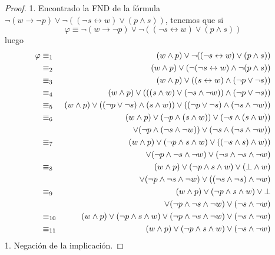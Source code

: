 \documentclass{article}
\begin{document}
\begin{itemize}
\begin{proof}
    1. Encontrado la FND de la fórmula
    $\neg(w \rightarrow \neg p) \lor \neg ((\neg s \leftrightarrow w) \lor (p \land s))$,
    tenemos que si
    \[
    \varphi \equiv \neg(w \rightarrow \neg p) \lor \neg ((\neg s \leftrightarrow w) \lor (p \land s))
    \]
    luego
    \begin{eqnarray*}
      \varphi
      &\equiv_{1}& (w \land p) \lor \neg ((\neg s \leftrightarrow w) \lor (p \land s))\\
      &\equiv_{2}& (w \land p) \lor ( \neg (\neg s \leftrightarrow w) \land  \neg (p \land s))\\
      &\equiv_{3}& (w \land p) \lor ((s \leftrightarrow w) \land  (\neg p \lor \neg s))\\
      &\equiv_{4}& (w \land p) \lor (((s \land w) \lor (\neg s \land \neg w)) \land  (\neg p \lor \neg s))\\
      &\equiv_{5}& (w \land p) \lor ((\neg p \lor \neg s) \land (s \land w)) \lor ((\neg p \lor \neg s)
      \land (\neg s \land \neg w))\\
      &\equiv_{6}& (w \land p) \lor (\neg p \land (s \land w)) \lor (\neg s \land (s \land w))\\
      & & \hspace*{1.2cm} \lor (\neg p \land (\neg s \land \neg w)) \lor (\neg s \land (\neg s \land \neg w))\\
      &\equiv_{7}& (w \land p) \lor (\neg p \land s \land w) \lor ((\neg s \land s) \land w))\\
      & & \hspace*{1.2cm} \lor (\neg p \land \neg s \land \neg w) \lor (\neg s \land \neg s \land \neg w)\\
      &\equiv_{8}& (w \land p) \lor (\neg p \land s \land w) \lor (\bot \land w)\\
      & & \hspace*{1.2cm} \lor (\neg p \land \neg s \land \neg w) \lor ((\neg s \land \neg s) \land \neg w)\\
      &\equiv_{9}& (w \land p) \lor (\neg p \land s \land w) \lor \bot\\
      & & \hspace*{1.2cm} \lor (\neg p \land \neg s \land \neg w) \lor (\neg s \land \neg w)\\
      &\equiv_{10}& (w \land p) \lor (\neg p \land s \land w) \lor (\neg p \land \neg s \land \neg w)
      \lor (\neg s \land \neg w)\\
      &\equiv_{11}& (w \land p) \lor (\neg p \land s \land w)\lor (\neg s \land \neg w)
    \end{eqnarray*}
    1. Negación de la implicación.
    

\end{proof}
\end{itemize}
\end{document}
